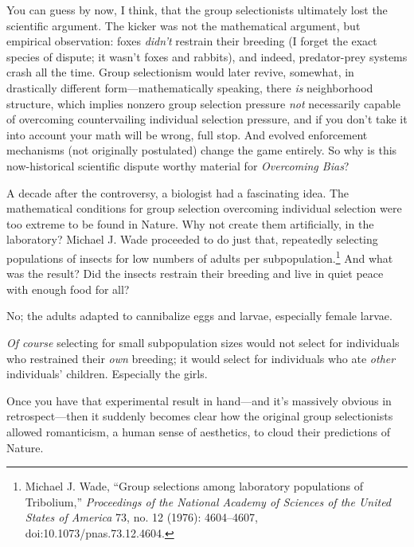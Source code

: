 {
 You can guess by now, I think, that the group selectionists
ultimately lost the scientific argument. The kicker was not the
mathematical argument, but empirical observation: foxes
\textit{didn't} restrain their breeding (I forget the
exact species of dispute; it wasn't foxes and rabbits),
and indeed, predator-prey systems crash all the time. Group
selectionism would later revive, somewhat, in drastically different
form---mathematically speaking, there \textit{is} neighborhood
structure, which implies nonzero group selection pressure \textit{not}
necessarily capable of overcoming countervailing individual selection
pressure, and if you don't take it into account your
math will be wrong, full stop. And evolved enforcement mechanisms (not
originally postulated) change the game entirely. So why is this
now-historical scientific dispute worthy material for
\textit{Overcoming Bias}?}

{
 A decade after the controversy, a biologist had a fascinating
idea. The mathematical conditions for group selection overcoming
individual selection were too extreme to be found in Nature. Why not
create them artificially, in the laboratory? Michael J. Wade proceeded
to do just that, repeatedly selecting populations of insects for low
numbers of adults per subpopulation.\footnote{Michael J. Wade, ``Group selections among
laboratory populations of Tribolium,''
\textit{Proceedings of the National Academy of Sciences of the United
States of America} 73, no. 12 (1976): 4604--4607,
doi:10.1073/pnas.73.12.4604.} And what was
the result? Did the insects restrain their breeding and live in quiet
peace with enough food for all?}

{
 No; the adults adapted to cannibalize eggs and larvae, especially
female larvae.}

{
 \textit{Of course} selecting for small subpopulation sizes would
not select for individuals who restrained their \textit{own} breeding;
it would select for individuals who ate \textit{other}
individuals' children. Especially the girls.}

{
 Once you have that experimental result in hand---and
it's massively obvious in retrospect---then it suddenly
becomes clear how the original group selectionists allowed romanticism,
a human sense of aesthetics, to cloud their predictions of Nature.}

